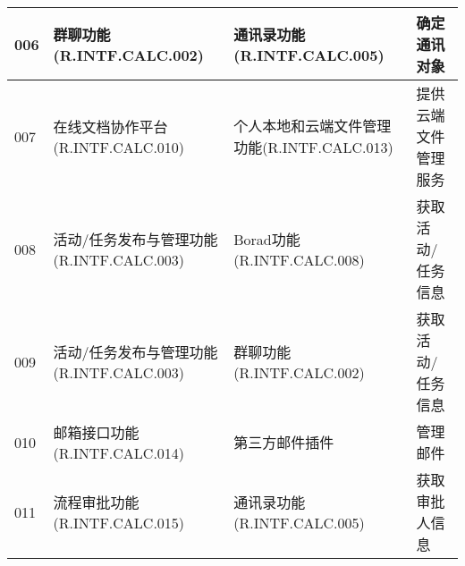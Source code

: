 \begin{table}[htbp]
\begin{tabular}{|p{6em}|p{9em}|p{9em}|p{7em}|}
            \hline%
            006        & 群聊功能(R.INTF.CALC.002)                & 通讯录功能(R.INTF.CALC.005)               & 确定通讯对象\\
            \hline%
            007        & 在线文档协作平台(R.INTF.CALC.010)         & 个人本地和云端文件管理功能(R.INTF.CALC.013)  & 提供云端文件管理服务\\
            \hline%
            008        & 活动/任务发布与管理功能(R.INTF.CALC.003)   & Borad功能(R.INTF.CALC.008)               & 获取活动/任务信息\\
            \hline%
            009        & 活动/任务发布与管理功能(R.INTF.CALC.003)   & 群聊功能(R.INTF.CALC.002)                 & 获取活动/任务信息\\
            \hline%
            010        & 邮箱接口功能(R.INTF.CALC.014)            & 第三方邮件插件                             & 管理邮件\\
            \hline%
                \color{red}011        
            &   \color{red}流程审批功能(R.INTF.CALC.015)            
            &   \color{red}通讯录功能(R.INTF.CALC.005)                
            &   \color{red}获取审批人信息       \\
            \hline%
    \end{tabular}
\end{table}

